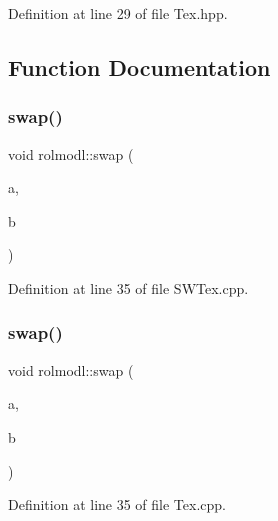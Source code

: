 Definition at line 29 of file Tex.\+hpp.



\subsection{Function Documentation}
\mbox{\label{namespacerolmodl_a6972596ae43e62bf3497e9fe22891a80}} 
\subsubsection{\texorpdfstring{swap()}{swap()}\hspace{0.1cm}{\footnotesize\ttfamily [1/5]}}
{\footnotesize\ttfamily void rolmodl\+::swap (\begin{DoxyParamCaption}\item[{\mbox{\hyperlink{classrolmodl_1_1_s_w_tex___base}{S\+W\+Tex\+\_\+\+Base}} \&}]{a,  }\item[{\mbox{\hyperlink{classrolmodl_1_1_s_w_tex___base}{S\+W\+Tex\+\_\+\+Base}} \&}]{b }\end{DoxyParamCaption})\hspace{0.3cm}{\ttfamily [noexcept]}}



Definition at line 35 of file S\+W\+Tex.\+cpp.

\mbox{\label{namespacerolmodl_a60f436efe75da5f7503368f157b3ae5c}} 
\subsubsection{\texorpdfstring{swap()}{swap()}\hspace{0.1cm}{\footnotesize\ttfamily [2/5]}}
{\footnotesize\ttfamily void rolmodl\+::swap (\begin{DoxyParamCaption}\item[{Tex \&}]{a,  }\item[{Tex \&}]{b }\end{DoxyParamCaption})\hspace{0.3cm}{\ttfamily [noexcept]}}



Definition at line 35 of file Tex.\+cpp.

\mbox{\label{namespacerolmodl_a3b17406cb55c5adda0581c1aad54f96a}} 
